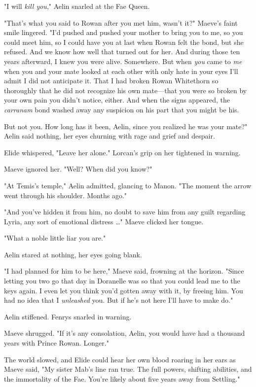 "I will \emph{kill you}," Aelin snarled at the Fae Queen.

"That's what you said to Rowan after you met him, wasn't it?" Maeve's faint smile lingered. "I'd pushed and pushed your mother to bring you to me, so you could meet him, so I could have you at last when Rowan felt the bond, but she refused. And we know how well that turned out for her. And during those ten years afterward, I knew you were alive. Somewhere. But when \emph{you} came to \emph{me}  when you and your mate looked at each other with only hate in your eyes  I'll admit I did not anticipate it. That I had broken Rowan Whitethorn so thoroughly that he did not recognize his own mate---that you were so broken by your own pain you didn't notice, either. And when the signs appeared, the \emph{carranam} bond washed away any suspicion on his part that you might be his.

But not you. How long has it been, Aelin, since you realized he was your mate?" Aelin said nothing, her eyes churning with rage and grief and despair.

Elide whispered, "Leave her alone." Lorcan's grip on her tightened in warning.

Maeve ignored her. "Well? When did you know?"

"At Temis's temple," Aelin admitted, glancing to Manon. "The moment the arrow went through his shoulder. Months ago."

"And you've hidden it from him, no doubt to save him from any guilt regarding Lyria, any sort of emotional distress \ldots" Maeve clicked her tongue.

"What a noble little liar you are."

Aelin stared at nothing, her eyes going blank.

"I had planned for him to be here," Maeve said, frowning at the horizon. "Since letting you two go that day in Doranelle was so that you could lead me to the keys again. I even let you think you'd gotten away with it, by freeing him. You had no idea that I \emph{unleashed}
you. But if he's not here  I'll have to make do."

Aelin stiffened. Fenrys snarled in warning.

Maeve shrugged. "If it's any consolation, Aelin, you would have had a thousand years with Prince Rowan. Longer."

The world slowed, and Elide could hear her own blood roaring in her ears as Maeve said, "My sister Mab's line ran true. The full powers, shifting abilities, and the immortality of the Fae. You're likely about five years away from Settling."

